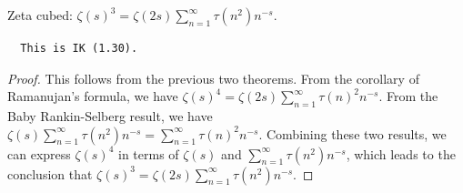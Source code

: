 \begin{theorem}
\label{zeta_pow_three_eq'}
\leanok
Zeta cubed: $\zeta(s)^3 = \zeta(2s) \sum_{n=1}^{\infty}\tau(n^2) n^{-s}$.
  \begin{verbatim}
  This is IK (1.30).
  \end{verbatim}
\end{theorem}
\begin{proof}
\leanok
This follows from the previous two theorems. From the corollary of Ramanujan's formula, we have $\zeta(s)^4 = \zeta(2s) \sum_{n=1}^{\infty} \tau(n)^2 n^{-s}$. From the Baby Rankin-Selberg result, we have $\zeta(s) \sum_{n=1}^{\infty} \tau(n^2) n^{-s} = \sum_{n=1}^{\infty} \tau(n)^2 n^{-s}$. Combining these two results, we can express $\zeta(s)^4$ in terms of $\zeta(s)$ and $\sum_{n=1}^{\infty} \tau(n^    2) n^{-s}$, which leads to the conclusion that $\zeta(s)^3 = \zeta(2s) \sum_{n=1}^{\infty} \tau(n^2) n^{-s}$.
\end{proof}
